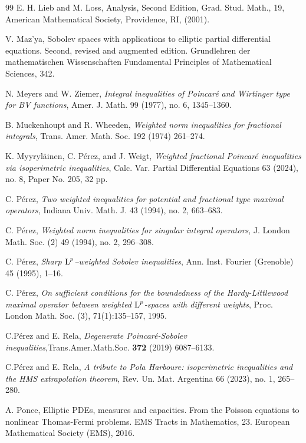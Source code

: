 \documentclass[11pt, a4paper, reqno]{amsart}
\newcommand{\Lup}{\textup{L}}
\theoremstyle{definition}
\theoremstyle{remark}
\begin{document}
\begin{thebibliography}{99}
 E. H. Lieb and M. Loss, {Analysis}, Second Edition, 
Grad. Stud. Math., 19, American Mathematical Society, Providence, RI, (2001). 

 V. Maz’ya, Sobolev spaces with applications to elliptic partial differential equations. Second, revised and augmented edition. Grundlehren der mathematischen Wissenschaften Fundamental Principles of Mathematical Sciences, 342.

 N. Meyers and W. Ziemer, \emph{Integral inequalities of Poincar\'e and Wirtinger type for BV functions}, Amer. J. Math. 99 (1977), no. 6, 1345--1360.

 B. Muckenhoupt and R. Wheeden, \emph{Weighted norm inequalities for fractional integrals}, Trans. Amer. Math. Soc. 192 (1974) 261--274.

 K. Myyryl\"ainen, C. P\'erez, and J. Weigt, \emph{Weighted fractional Poincaré inequalities via isoperimetric inequalities}, Calc. Var. Partial Differential Equations 63 (2024), no. 8, Paper No. 205, 32 pp.

 C. P\'erez, \emph{Two weighted inequalities for potential and fractional type maximal operators}, Indiana Univ. Math. J. 43 (1994), no. 2, 663--683.


 C. P\'erez, \emph{Weighted norm inequalities for singular integral operators}, J. London Math. Soc. (2) 49 (1994), no. 2, 296--308.


 C. Pérez, \emph{Sharp $\Lup^p$–weighted Sobolev inequalities}, Ann. Inst. Fourier (Grenoble) 45 (1995), 1--16.


 C. P\'erez, \emph{On sufficient conditions for the boundedness of the Hardy-Littlewood
maximal operator between weighted $\Lup^p$-spaces with different weights}, Proc. London Math. Soc. (3), 71(1):135--157, 1995.

 C.P\'erez and E. Rela, \emph{Degenerate Poincar\'e-Sobolev inequalities},Trans.Amer.Math.Soc. {\bfseries 372} (2019) 6087--6133.

 C.P\'erez and E. Rela, \emph{A tribute to Pola Harboure: isoperimetric inequalities and the HMS extrapolation theorem},
Rev. Un. Mat. Argentina 66 (2023), no. 1, 265--280.

 A. Ponce, Elliptic PDEs, measures and capacities. From the Poisson equations to nonlinear Thomas-Fermi problems.
EMS Tracts in Mathematics, 23. European Mathematical Society (EMS), 2016.


\end{thebibliography}
\end{document}
